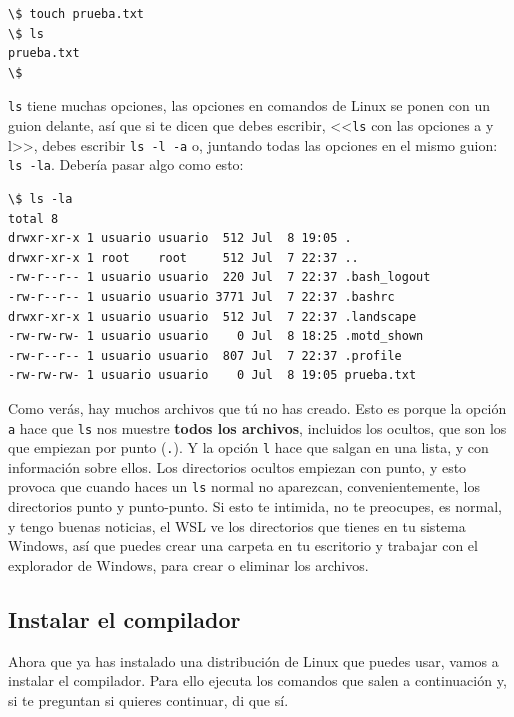 \documentclass[a4paper]{article}
\begin{document}
\noindent
\begin{minipage}[H]{\linewidth}
\mbox{}
\begin{lstlisting}[style=terminalStyle]
\$ touch prueba.txt
\$ ls
prueba.txt
\$
\end{lstlisting}
\end{minipage}

\verb!ls! tiene muchas opciones, las opciones en comandos de Linux se ponen
con un guion delante, así que si te dicen que debes escribir, <<\verb!ls!
con las opciones a y l>>, debes escribir \verb!ls -l -a! o, juntando todas
las opciones en el mismo guion: \verb!ls -la!. Debería pasar algo como esto:

\noindent
\begin{minipage}[H]{\linewidth}
\mbox{}
\begin{lstlisting}[style=terminalStyle]
\$ ls -la
total 8
drwxr-xr-x 1 usuario usuario  512 Jul  8 19:05 .
drwxr-xr-x 1 root    root     512 Jul  7 22:37 ..
-rw-r--r-- 1 usuario usuario  220 Jul  7 22:37 .bash_logout
-rw-r--r-- 1 usuario usuario 3771 Jul  7 22:37 .bashrc
drwxr-xr-x 1 usuario usuario  512 Jul  7 22:37 .landscape
-rw-rw-rw- 1 usuario usuario    0 Jul  8 18:25 .motd_shown
-rw-r--r-- 1 usuario usuario  807 Jul  7 22:37 .profile
-rw-rw-rw- 1 usuario usuario    0 Jul  8 19:05 prueba.txt
\end{lstlisting}
\end{minipage}



Como verás, hay muchos archivos que tú no has creado. Esto es porque la opción
\verb!a! hace que \verb!ls! nos muestre \textbf{todos los archivos}, incluidos
los ocultos, que son los que empiezan por punto (\verb!.!). Y la opción \verb!l!
hace que salgan en una lista, y con información sobre ellos. Los directorios
ocultos empiezan con punto, y esto provoca que cuando haces un \verb!ls! normal
no aparezcan, convenientemente, los directorios punto y punto-punto.
Si esto te intimida, no te preocupes, es normal, y tengo buenas noticias, el WSL
ve los directorios que tienes en tu sistema Windows, así que puedes crear una
carpeta en tu escritorio y trabajar con el explorador de Windows, para crear
o eliminar los archivos.

\subsection{Instalar el compilador}
Ahora que ya has instalado una distribución de Linux que puedes usar, vamos
a instalar el compilador. Para ello ejecuta los comandos que salen a
continuación y, si te preguntan si quieres continuar, di que sí.
\end{document}
